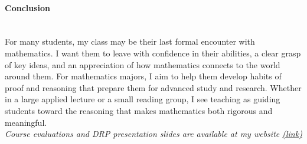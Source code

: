 \documentclass[11pt]{article}
\begin{document}
\paragraph{Conclusion} \quad \\
For many students, my class may be their last formal encounter with mathematics. I want them to leave with confidence in their abilities, a clear grasp of key ideas, and an appreciation of how mathematics connects to the world around them. For mathematics majors, I aim to help them develop habits of proof and reasoning that prepare them for advanced study and research. Whether in a large applied lecture or a small reading group, I see teaching as guiding students toward the reasoning that makes mathematics both rigorous and meaningful.
\\

\hfill
\noindent \textit{ \small Course evaluations and DRP presentation slides are available at my website \href{https://sites.google.com/view/myungsin-cho/teaching?authuser=0}{(link)}}
\end{document}
